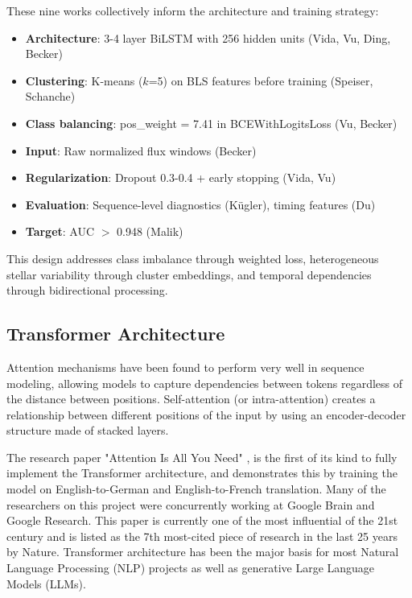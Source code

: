 \documentclass[letterpaper]{article} %
\begin{document}
These nine works collectively inform the architecture and training strategy:

\begin{itemize}
    \item \textbf{Architecture}: 3-4 layer BiLSTM with 256 hidden units (Vida, Vu, Ding, Becker)
    \item \textbf{Clustering}: K-means ($k$=5) on BLS features before training (Speiser, Schanche)
    \item \textbf{Class balancing}: pos\_weight = 7.41 in BCEWithLogitsLoss (Vu, Becker)
    \item \textbf{Input}: Raw normalized flux windows (Becker)
    \item \textbf{Regularization}: Dropout 0.3-0.4 + early stopping (Vida, Vu)
    \item \textbf{Evaluation}: Sequence-level diagnostics (K\"ugler), timing features (Du)
    \item \textbf{Target}: AUC $>$ 0.948 (Malik)
\end{itemize}

This design addresses class imbalance through weighted loss, heterogeneous stellar variability through cluster embeddings, and temporal dependencies through bidirectional processing.

\subsection{Transformer Architecture}
Attention mechanisms have been found to perform very well in sequence modeling, allowing models to capture dependencies between tokens regardless of the distance between positions. Self-attention (or intra-attention) creates a relationship between different positions of the input by using an encoder-decoder structure made of stacked layers.

The research paper "Attention Is All You Need" \cite{vaswani2017attentionneed}, is the first of its kind to fully implement the Transformer architecture, and demonstrates this by training the model on English-to-German and English-to-French translation. Many of the researchers on this project were concurrently working at Google Brain and Google Research. This paper is currently one of the most influential of the 21st century and is listed as the 7th most-cited piece of research in the last 25 years by Nature. Transformer architecture has been the major basis for most Natural Language Processing (NLP) projects as well as generative Large Language Models (LLMs).
\end{document}
